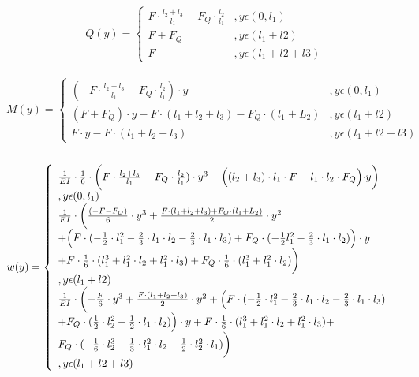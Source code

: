\begin{equation}
	Q(y)=\left\{\begin{array}{ll}
		F\cdot \frac{l_{2}+l_{3}}{l_{1}}-F_{Q}\cdot \frac{l_{2}}{l_{1}}&,y\epsilon (0,l_{1})\\
		F+F_{Q}&,y\epsilon (l_{1}+l{2})\\
		F&,y\epsilon (l_{1}+l{2}+l{3})
	\end{array}\right.
\end{equation}\\
\begin{equation}
	M(y)=\left\{\begin{array}{ll}
		(-F\cdot \frac{l_{2}+l_{3}}{l_{1}}-F_{Q}\cdot \frac{l_{2}}{l_{1}})\cdot y&,y\epsilon (0,l_{1})\\
		(F+F_{Q})\cdot y - F\cdot (l_{1}+l_{2}+l_{3})-F_{Q}\cdot (l_{1}+L_{2})&,y\epsilon (l_{1}+l{2})\\
		F\cdot y - F\cdot (l_{1}+l_{2}+l_{3})&,y\epsilon (l_{1}+l{2}+l{3})
	\end{array}\right.
\end{equation}\\
\begin{equation}
	w(y)=\left\{\begin{array}{ll}
		\frac{1}{EI}\cdot\frac{1}{6}\cdot\biggl(F\cdot \frac{l_{2}+l_{3}}{l_{1}}-F_{Q}\cdot \frac{l_{2}}{l_{1}})\cdot y^{3}-\Bigl((l_{2}+l_{3})\cdot l_{1}\cdot F-l_{1}\cdot l_{2}\cdot F_{Q}\Bigl)\cdot y \biggr)&\\,y\epsilon (0,l_{1})\\
		\frac{1}{EI}\cdot\biggl(\frac{(-F-F_{Q})}{6}\cdot y^{3} + \frac{F\cdot (l_{1}+l_{2}+l_{3})+F_{Q}\cdot (l_{1}+L_{2})}{2}\cdot y^{2}\\ + \Bigl(F\cdot(-\frac{1}{2}\cdot l_{1}^{2}-\frac{2}{3}\cdot l_{1}\cdot l_{2}-\frac{2}{3}\cdot l_{1}\cdot l_{3})+ F_{Q}\cdot(-\frac{1}{2}l_{1}^{2}-\frac{2}{3}\cdot l_{1}\cdot l_{2})\Bigr)\cdot y \\+ F\cdot\frac{1}{6}\cdot(l_{1}^{3}+l_{1}^{2}\cdot l_{2}+l_{1}^{2}\cdot l_{3}) + F_{Q}\cdot\frac{1}{6}\cdot(l_{1}^{3}+l_{1}^{2}\cdot l_{2})\biggr)&\\,y\epsilon (l_{1}+l{2})\\
		\frac{1}{EI}\cdot\biggl(-\frac{F}{6}\cdot y^{3} + \frac{ F\cdot (l_{1}+l_{2}+l_{3})}{2}\cdot y^{2} + \Bigl(F\cdot(-\frac{1}{2}\cdot l_{1}^{2} -\frac{2}{3}\cdot l_{1}\cdot l_{2}-\frac{2}{3}\cdot l_{1}\cdot l_{3})\\ + F_{Q}\cdot(\frac{1}{2}\cdot l_{2}^{2}+\frac{1}{2}\cdot l_{1}\cdot l_{2})\Bigr)\cdot y +F\cdot\frac{1}{6}\cdot(l_{1}^{3}+l_{1}^{2}\cdot l_{2}+l_{1}^{2}\cdot l_{3}) + \\F_{Q}\cdot(-\frac{1}{6}\cdot l_{2}^{3}-\frac{1}{3}\cdot l_{1}^{2}\cdot l_{2}-\frac{1}{2}\cdot l_{2}^{2}\cdot l_{1})\biggr)&\\,y\epsilon (l_{1}+l{2}+l{3})
	\end{array}\right.
\end{equation}





